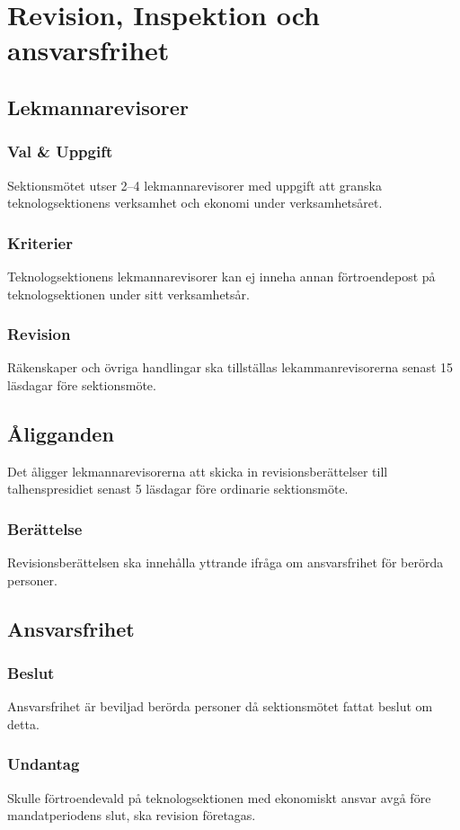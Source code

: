 \section{Revision, Inspektion och ansvarsfrihet}
\subsection{Lekmannarevisorer}
\subsubsection{Val \& Uppgift}
Sektionsmötet utser 2–4 lekmannarevisorer med uppgift att granska teknologsektionens verksamhet och ekonomi under verksamhetsåret.
\subsubsection{Kriterier}
Teknologsektionens lekmannarevisorer kan ej inneha annan förtroendepost på teknologsektionen under sitt verksamhetsår.
\subsubsection{Revision}
Räkenskaper och övriga handlingar ska tillställas lekammanrevisorerna senast 15 läsdagar före sektionsmöte.
\subsection{Åligganden}
Det åligger lekmannarevisorerna att skicka in revisionsberättelser till talhenspresidiet senast 5 läsdagar före ordinarie sektionsmöte.
\subsubsection{Berättelse}
Revisionsberättelsen ska innehålla yttrande ifråga om ansvarsfrihet för berörda personer.
\subsection{Ansvarsfrihet}
\subsubsection{Beslut}
Ansvarsfrihet är beviljad berörda personer då sektionsmötet fattat beslut om detta.
\subsubsection{Undantag}
Skulle förtroendevald på teknologsektionen med ekonomiskt ansvar avgå före mandatperiodens slut, ska revision företagas.
